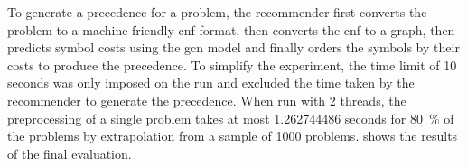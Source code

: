 To generate a precedence for a problem,
the recommender first converts the problem to a machine-friendly \gls{cnf} format,
then converts the \gls{cnf} to a graph,
then predicts symbol costs using the \gls{gcn} model
and finally orders the symbols by their costs to produce the precedence.
To simplify the experiment, the time limit of 10 seconds was only imposed on the \Vampire{} run
and excluded the time taken by the recommender to generate the precedence.
When run with 2 threads,
the preprocessing of a single problem
takes at most \num[round-mode=places,round-precision=2]{1.262744486} seconds
for \SI{80}{\percent} of the problems
by extrapolation from a sample of \num{1000} problems.
 shows the results of the final evaluation.

